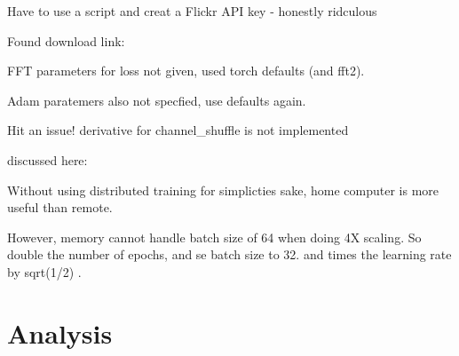 \documentclass{article}
\begin{document}
    Have to use a script and creat a Flickr API key - honestly ridculous

    Found download link:


    FFT parameters for loss not given, used torch defaults (and fft2).

    Adam paratemers also not specfied, use defaults again.

    Hit an issue! derivative for channel_shuffle is not implemented

    discussed here:

    Without using distributed training for simplicties sake,
    home computer is more useful than remote.

    However, memory cannot handle batch size of 64 when doing 4X scaling.
    So double the number of epochs, and se batch size to 32.
    and times the learning rate by sqrt(1/2) \citep{krizhevsky2014weird}.



    \section{Analysis}



    
    
\end{document}
